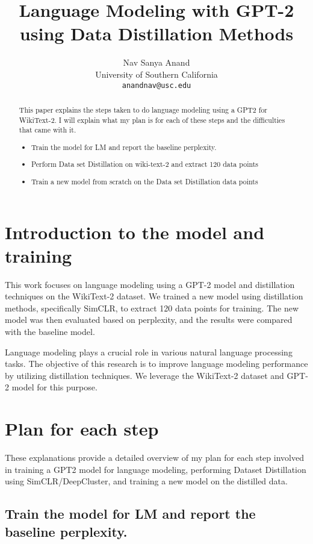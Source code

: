 \documentclass{article}
\title{Language Modeling with GPT-2 using Data Distillation Methods}
\author{
  Nav Sanya Anand \\
  University of Southern California \\
  \texttt{anandnav@usc.edu} \\
}
\begin{document}
\maketitle

\begin{abstract}
  This paper explains the steps taken to do language modeling using a GPT2 for WikiText-2. I will explain what my plan is for each of these steps and the difficulties that came with it.
  \begin{itemize}
  \item Train the model for LM and report the baseline perplexity.
  \item Perform Data set Distillation on wiki-text-2 and extract 120 data points
  \item Train a new model from scratch on the Data set Distillation data points
  \end{itemize}
  
\end{abstract}


\section*{Introduction to the model and training}

This work focuses on language modeling using a GPT-2 model and distillation techniques on the WikiText-2 dataset. We trained a new model using distillation methods, specifically SimCLR, to extract 120 data points for training. The new model was then evaluated based on perplexity, and the results were compared with the baseline model.

\medskip

Language modeling plays a crucial role in various natural language processing tasks. The objective of this research is to improve language modeling performance by utilizing distillation techniques. We leverage the WikiText-2 dataset and GPT-2 model for this purpose.

\section*{Plan for each step}
\label{heading}
These explanations provide a detailed overview of my plan for each step involved in training a GPT2 model for language modeling, performing Dataset Distillation using SimCLR/DeepCluster, and training a new model on the distilled data. 

\subsection{Train the model for LM and report the baseline perplexity.}
\label{gen_inst}
\end{document}
